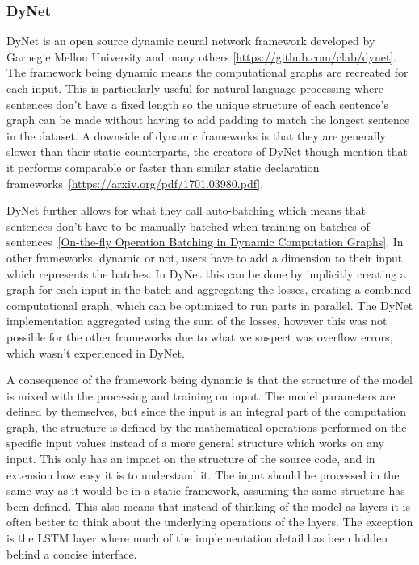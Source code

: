 \subsubsection*{DyNet}

DyNet is an open source dynamic neural network framework developed by Garnegie
Mellon University and many others \ref{https://github.com/clab/dynet}. The
framework being dynamic means the computational graphs are recreated for each
input. This is particularly useful for natural language processing where
sentences don't have a fixed length so the unique structure of each sentence's
graph can be made without having to add padding to match the longest sentence in
the dataset. A downside of dynamic frameworks is that they are generally slower
than their static counterparts, the creators of DyNet though mention that it
performs comparable or faster than similar static declaration
frameworks~\ref{https://arxiv.org/pdf/1701.03980.pdf}.   

DyNet further allows for what they call auto-batching which means that sentences
don't have to be manually batched when training on batches of
sentences~\ref{On-the-fly Operation Batching in Dynamic Computation Graphs}. In
other frameworks, dynamic or not, users have to add a dimension to their input
which represents the batches. In DyNet this can be done by implicitly creating a
graph for each input in the batch and aggregating the losses, creating a
combined computational graph, which can be optimized to run parts in parallel.
The DyNet implementation aggregated using the sum of the losses, however this
was not possible for the other frameworks due to what we suspect was overflow
errors, which wasn't experienced in DyNet. 

A consequence of the framework being dynamic is that the structure of the model
is mixed with the processing and training on input. The model parameters are
defined by themselves, but since the input is an integral part of the
computation graph, the structure is defined by the mathematical operations
performed on the specific input values instead of a more general structure which
works on any input. This only has an impact on the structure of the source code,
and in extension how easy it is to understand it. The input should be processed
in the same way as it would be in a static framework, assuming the same
structure has been defined. This also means that instead of thinking of the
model as layers it is often better to think about the underlying operations of
the layers. The exception is the LSTM layer where much of the
implementation detail has been hidden behind a concise interface.

